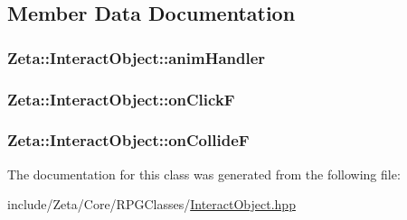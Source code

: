 \subsection{Member Data Documentation}
\hypertarget{classZeta_1_1InteractObject_ae11e1d3a934160243a3ef12a47355118}{
\subsubsection[{anim\+Handler}]{ Zeta\+::\+Interact\+Object\+::anim\+Handler\hspace{0.3cm}{\ttfamily [private]}}}\label{classZeta_1_1InteractObject_ae11e1d3a934160243a3ef12a47355118}
\hypertarget{classZeta_1_1InteractObject_a370c5c376ef48153bf767e5cbfc73ec0}{
\subsubsection[{on\+Click\+F}]{ Zeta\+::\+Interact\+Object\+::on\+Click\+F\hspace{0.3cm}{\ttfamily [private]}}}\label{classZeta_1_1InteractObject_a370c5c376ef48153bf767e5cbfc73ec0}
\hypertarget{classZeta_1_1InteractObject_a06c002c859383d13b6e8f3a0698c836d}{
\subsubsection[{on\+Collide\+F}]{ Zeta\+::\+Interact\+Object\+::on\+Collide\+F\hspace{0.3cm}{\ttfamily [private]}}}\label{classZeta_1_1InteractObject_a06c002c859383d13b6e8f3a0698c836d}


The documentation for this class was generated from the following file\+:\begin{DoxyCompactItemize}
\item 
include/\+Zeta/\+Core/\+R\+P\+G\+Classes/\hyperlink{InteractObject_8hpp}{Interact\+Object.\+hpp}\end{DoxyCompactItemize}
